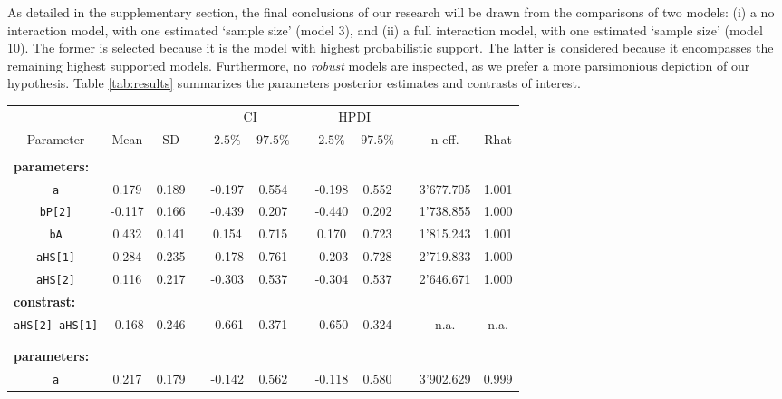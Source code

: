 As detailed in the supplementary section, the final conclusions of our research will be drawn from the comparisons of two models: (i) a no interaction model, with one estimated `sample size' (model 3), and (ii) a full interaction model, with one estimated `sample size' (model 10). The former is selected because it is the model with highest probabilistic support. The latter is considered because it encompasses the remaining highest supported models. Furthermore, no \textit{robust} models are inspected, as we prefer a more parsimonious depiction of our hypothesis. Table \ref{tab:results} summarizes the parameters posterior estimates and contrasts of interest. 
%
\begin{table}[h!]
	\centering
	\begin{tabular}{|cccccccccccc|} 
		\hline
		& \multicolumn{3}{c}{} & \multicolumn{2}{c}{CI} & & \multicolumn{2}{c}{HPDI} & & \multicolumn{2}{c|}{}\\[0.5ex]
		\cline{5-6} \cline{8-9}
		Parameter & Mean & SD & & $2.5\%$ & $97.5\%$ & & $2.5\%$ & $97.5\%$ & & n eff. & Rhat \\[0.5ex] 
		\hline\hline
		\rowcolor{gray}
		\multicolumn{12}{|l|}{ \textbf{Model 3: No interaction (one `size')} } \\
		\multicolumn{12}{|l|}{ \textbf{parameters:} } \\
		\texttt{a} & 0.179 & 0.189 & & -0.197 & 0.554 & & -0.198 & 0.552 & & 3'677.705 & 1.001\\
		\texttt{bP[2]} & -0.117 & 0.166 & & -0.439 & 0.207 & & -0.440 & 0.202 & & 1'738.855 & 1.000 \\
		\texttt{bA} & 0.432 & 0.141 & & 0.154 & 0.715 & & 0.170 & 0.723 & & 1'815.243 & 1.001 \\
		\texttt{aHS[1]} & 0.284 & 0.235 & & -0.178 & 0.761 & & -0.203 & 0.728 & & 2'719.833 & 1.000 \\
		\texttt{aHS[2]} & 0.116 & 0.217 & & -0.303 & 0.537 & & -0.304 & 0.537 & & 2'646.671 & 1.000 \\
		\multicolumn{12}{|l|}{ \textbf{constrast:} } \\
		\texttt{aHS[2]-aHS[1]} & -0.168 & 0.246 & & -0.661 & 0.371 & & -0.650 & 0.324 & & n.a. & n.a. \\
		\multicolumn{12}{|l|}{ } \\
		\rowcolor{gray}
		\multicolumn{12}{|l|}{ \textbf{Model 10: Full interaction (one `size')} } \\
		\multicolumn{12}{|l|}{ \textbf{parameters:} } \\
		\texttt{a} & 0.217 & 0.179 & & -0.142 & 0.562 & & -0.118 & 0.580 & & 3'902.629 & 0.999 \\

\end{tabular}
\end{table}
